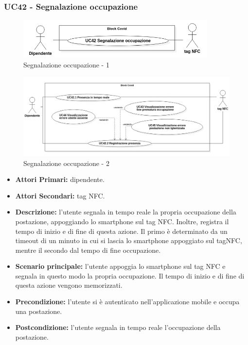 \subsubsection{ UC42 - Segnalazione occupazione}
\begin{figure}[H]
	\centering
	\includegraphics[width=10cm]{res/images/UC42.png}
	\caption{Segnalazione occupazione - 1}
	\label{fig:Segnalazione occupazione - 1}
\end{figure}
\begin{figure}[H]
	\centering
	\includegraphics[width=18cm]{res/images/UC42-43-44-45.png}
	\caption{Segnalazione occupazione - 2}
	\label{fig:Segnalazione occupazione - 2}
\end{figure}
\begin{itemize}
	\item\textbf{Attori Primari:} dipendente.
	\item\textbf{Attori Secondari:} tag NFC.
	\item\textbf{Descrizione:} l’utente segnala in tempo reale la propria occupazione della postazione, appoggiando lo smartphone sul tag NFC. Inoltre, registra il tempo di inizio e di fine di questa azione. Il primo è determinato da un timeout di un minuto in cui si lascia lo smartphone appoggiato sul tagNFC, mentre il secondo dal tempo di fine occupazione.
	\item\textbf{Scenario principale:} l’utente appoggia lo smartphone sul tag NFC e segnala in questo modo la propria occupazione.
	Il tempo di inizio e di fine di questa azione vengono memorizzati.
	\item\textbf{Precondizione:} l’utente si è autenticato nell'applicazione mobile e occupa una postazione.
	\item\textbf{Postcondizione:} l’utente segnala in tempo reale l'occupazione della postazione.
\end{itemize}

